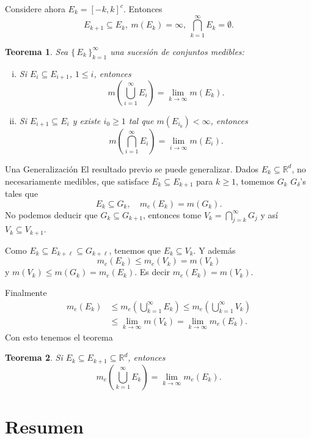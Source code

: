 \documentclass[utf8]{beamer}
\theoremstyle{plain}
\newtheorem{Th}{Teorema}               %
\theoremstyle{definition}
\theoremstyle{remark}
\numberwithin{equation}{section}
\newcommand{\dl}{\delta}                %
\newcommand{\bR}{\mathbb{R}}    %
\newcommand{\bonj}[1]{\left\lbrack#1\right\rbrack}
\newcommand{\set}[1]{\{\,#1\,\}}    %
\renewcommand{\geq}{\geqslant}          %
\renewcommand{\l}{\ell}                   %
\renewcommand{\leq}{\leqslant}          %
\newcommand{\suci}{_{i=1}^\infty} %
\newcommand{\suck}{_{k=1}^\infty} %
\renewcommand{\.}{\Cdot}                %
\begin{document}
\begin{frame}
  Considere ahora $E_k=\bonj{-k,k}^c$. Entonces 
  $$E_{k+1}\subseteq E_k,\ m(E_k)=\infty,\ \bigcap\suck E_k=\emptyset.$$
  \begin{Th}
    Sea $\set{E_k}\suck$ una sucesión de conjuntos medibles:
    \begin{enumerate}[(i)]
      \item Si $E_i\subseteq E_{i+1}$, $1\leq i$, entonces 
      $$m\left(\bigcup\suci E_i\right)=\lim_{k\to\infty}m(E_k).$$
      \item Si $E_{i+1}\subseteq E_i$ y existe $i_0\geq 1$ tal que $m(E_{i_0})<\infty$, entonces 
      $$m\left(\bigcap\suci E_i\right)=\lim_{i\to\infty}m(E_i).$$
    \end{enumerate}
  \end{Th}

\end{frame}

\begin{frame}{Una Generalización}
  El resultado previo se puede generalizar. Dados $E_k\subseteq\bR^d$, no necesariamente medibles, que satisface $E_k\subseteq E_{k+1}$ para $k\geq 1$, tomemos $G_k$ $G_\dl$'s
 tales que
$$E_k\subseteq G_k,\quad m_e(E_k)=m(G_k).$$
No podemos deducir que $G_k\subseteq G_{k+1}$, entonces tome $V_k=\bigcap_{j=k}^\infty G_j$ y así $V_k\subseteq V_{k+1}$.\par 
Como $E_k\subseteq E_{k+\l}\subseteq G_{k+\l}$, tenemos que $E_k\subseteq V_k$. Y además 
$$m_e(E_k)\leq m_e(V_k)=m(V_k)$$
y $m(V_k)\leq m(G_k)=m_e(E_k)$. Es decir $m_e(E_k)=m(V_k)$.
\end{frame}

\begin{frame}
  Finalmente 
  \begin{align*}
    m_e(E_k)&\leq m_e\left(\bigcup\suck E_k\right)\leq m_e\left(\bigcup\suck V_k\right)\\
    &\leq \lim_{k\to\infty}m(V_k)=\lim_{k\to\infty}m_e(E_k).
  \end{align*}
  Con esto tenemos el teorema 
  \begin{Th}\label{th:sucDeConjsMedida}
    Si $E_k\subseteq E_{k+1}\subseteq\bR^d$, entonces 
    $$m_e\left(\bigcup\suck E_k\right)=\lim_{k\to\infty}m_e(E_k).$$
  \end{Th}
\end{frame}
\section*{Resumen}
\end{document}
